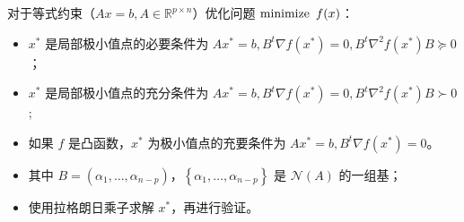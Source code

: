 \begin{remark}
	对于等式约束（$Ax=b, A\in \mathbb{R}^{p\times n}$）优化问题 $\operatorname{minimize}\ f(x)$：
	\begin{itemize}
		\item $x^*$ 是局部极小值点的必要条件为 $Ax^*=b, B^t\nabla f(x^*) = 0, B^t\nabla^2f(x^*)B \succeq 0$；
		\item $x^*$ 是局部极小值点的充分条件为 $Ax^*=b, B^t\nabla f(x^*) = 0, B^t\nabla^2f(x^*)B \succ 0$;
		\item 如果 $f$ 是凸函数，$x^*$ 为极小值点的充要条件为 $Ax^*=b, B^t\nabla f(x^*) = 0$。
		\item 其中 $B=(\alpha_1, \dots, \alpha_{n - p})$，$\left\{\alpha_1, \dots, \alpha_{n - p}\right\}$ 是 $\mathcal{N}(A)$ 的一组基；
		\item 使用拉格朗日乘子求解 $x^*$，再进行验证。
	\end{itemize}
\end{remark}

